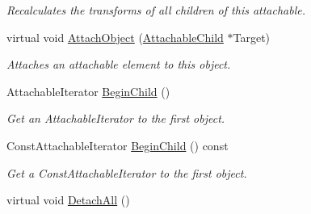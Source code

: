 \begin{DoxyCompactItemize}
\begin{DoxyCompactList}\small\item\em Recalculates the transforms of all children of this attachable. \item\end{DoxyCompactList}\item 
virtual void \hyperlink{classMezzanine_1_1AttachableParent_a558c6e2dd0a31cd99bb7872394de9c00}{AttachObject} (\hyperlink{classMezzanine_1_1AttachableChild}{AttachableChild} $\ast$Target)
\begin{DoxyCompactList}\small\item\em Attaches an attachable element to this object. \item\end{DoxyCompactList}\item 
AttachableIterator \hyperlink{classMezzanine_1_1AttachableParent_a6ed49c42b138227094b579638fd06538}{BeginChild} ()
\begin{DoxyCompactList}\small\item\em Get an AttachableIterator to the first object. \item\end{DoxyCompactList}\item 
ConstAttachableIterator \hyperlink{classMezzanine_1_1AttachableParent_a4693daab5f6ad884fbe64f718c016384}{BeginChild} () const 
\begin{DoxyCompactList}\small\item\em Get a ConstAttachableIterator to the first object. \item\end{DoxyCompactList}\item 
\hypertarget{classMezzanine_1_1AttachableParent_a1098f9a8f0556fec95c1bd6c8503da86}{
virtual void \hyperlink{classMezzanine_1_1AttachableParent_a1098f9a8f0556fec95c1bd6c8503da86}{DetachAll} ()}
\label{classMezzanine_1_1AttachableParent_a1098f9a8f0556fec95c1bd6c8503da86}


\end{DoxyCompactItemize}
